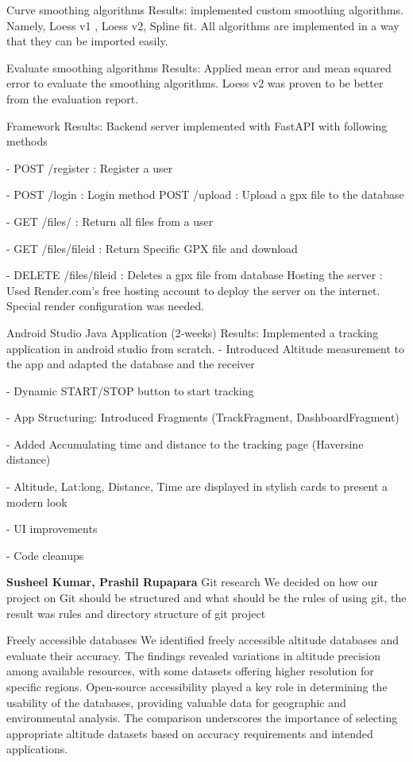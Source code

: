 \documentclass[12pt]{article}
\begin{document}
Curve smoothing algorithms 
Results: implemented custom smoothing algorithms. Namely, Loess v1 , Loess v2, Spline fit.  All algorithms are implemented in a way that they can be imported easily. 

Evaluate smoothing algorithms 
Results: Applied mean error and mean squared error to evaluate the smoothing algorithms. Loess v2 was proven to be better from the evaluation report. 

Framework 
Results: Backend server implemented with FastAPI with following methods 

- POST /register : Register a user 

- POST /login : Login method  POST /upload : Upload a gpx file to the database 

- GET /files/ : Return all files from a user 

- GET /files/fileid : Return Specific GPX file and download 

- DELETE /files/fileid : Deletes a gpx file from database 
Hosting the server : Used Render.com’s free hosting account to deploy the server on the internet. Special render configuration was needed. 

Android Studio Java Application (2-weeks) 
Results: Implemented a tracking application in android studio from scratch. 
- Introduced Altitude measurement to the app and adapted the database and the receiver 

- Dynamic START/STOP button to start tracking 

- App Structuring: Introduced Fragments (TrackFragment, DashboardFragment) 

- Added Accumulating time and distance to the tracking page (Haversine distance) 

- Altitude, Lat:long, Distance, Time are displayed in stylish cards to present a modern look 

- UI improvements 

- Code cleanups

{\large\textbf{Susheel Kumar, Prashil Rupapara}}
Git research
We decided on how our project on Git should be structured and what should be the rules of using git, the result was rules and directory structure of git project

Freely accessible databases
We identified freely accessible altitude databases and evaluate their accuracy. The findings revealed variations in altitude precision among available resources, with some datasets offering higher resolution for specific regions. Open-source accessibility played a key role in determining the usability of the databases, providing valuable data for geographic and environmental analysis. The comparison underscores the importance of selecting appropriate altitude datasets based on accuracy requirements and intended applications.
\end{document}
